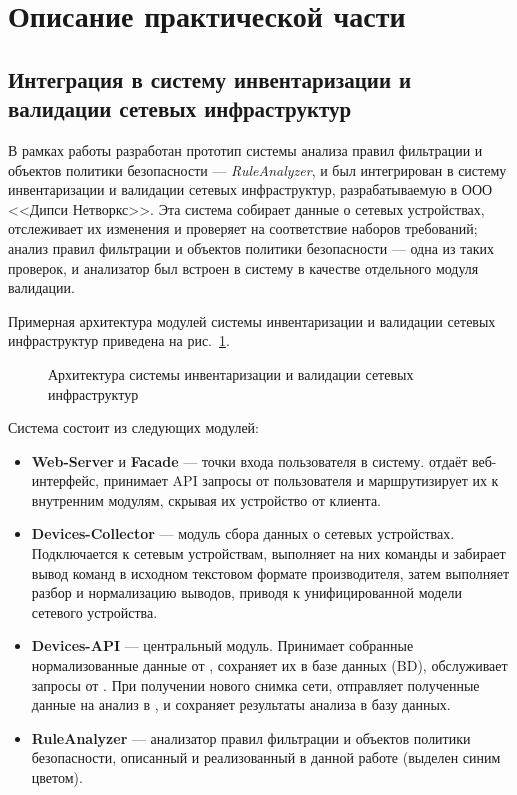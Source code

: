 \section{Описание практической части}
\label{sec:Section4} 

\subsection{Интеграция в систему инвентаризации и валидации сетевых инфраструктур}

В рамках работы разработан прототип системы анализа правил фильтрации и объектов политики безопасности --- \emph{RuleAnalyzer}, и был интегрирован в систему инвентаризации и валидации сетевых инфраструктур, разрабатываемую в ООО <<Дипси Нетворкс>>. Эта система собирает данные о сетевых устройствах, отслеживает их изменения и проверяет на соответствие наборов требований; анализ правил фильтрации и объектов политики безопасности --- одна из таких проверок, и анализатор был встроен в систему в качестве отдельного модуля валидации.

Примерная архитектура модулей системы инвентаризации и валидации сетевых инфраструктур приведена на рис.~\ref{fig:pipeline_1}.

\begin{figure}[H]
    \centering
    
    \caption{Архитектура системы инвентаризации и валидации сетевых инфраструктур}
    \label{fig:pipeline_1}
\end{figure}

Система состоит из следующих модулей:
\begin{itemize}
    \item \textbf{Web-Server} и \textbf{Facade} --- точки входа пользователя в систему.  отдаёт веб-интерфейс,  принимает API запросы от пользователя и маршрутизирует их к внутренним модулям, скрывая их устройство от клиента.
    \item \textbf{Devices-Collector} --- модуль сбора данных о сетевых устройствах. Подключается к сетевым устройствам, выполняет на них команды и забирает вывод команд в исходном текстовом формате производителя, затем выполняет разбор и нормализацию выводов, приводя к унифицированной модели сетевого устройства.
    \item \textbf{Devices-API} --- центральный модуль. Принимает собранные нормализованные данные от , сохраняет их в базе данных (BD), обслуживает запросы от . При получении нового снимка сети, отправляет полученные данные на анализ в , и сохраняет результаты анализа в базу данных.
    \item \textbf{RuleAnalyzer} --- анализатор правил фильтрации и объектов политики безопасности, описанный и реализованный в данной работе (выделен синим цветом).
\end{itemize}

